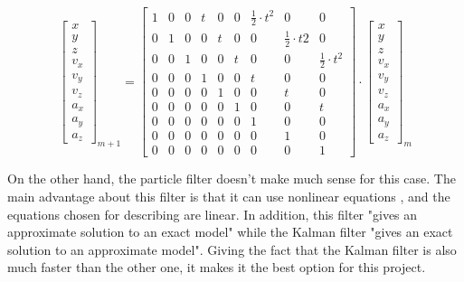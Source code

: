\begin{equation}
\begin{bmatrix}
x \\ y \\ z \\ v_{x} \\ v_{y} \\ v_{z} \\ a_{x} \\ a_{y} \\ a_{z}
\end{bmatrix}_{m+1}
=
\begin{bmatrix}
1 & 0 & 0 & t & 0 & 0 & \frac{1}{2}·t^{2} & 0 & 0 \\
0 & 1 & 0 & 0 & t & 0 & 0 & \frac{1}{2}·t{2} & 0 \\
0 & 0 & 1 & 0 & 0 & t & 0 & 0 & \frac{1}{2}·t^{2}	\\
0 & 0 & 0 & 1 & 0 & 0 & t & 0 & 0 \\
0 & 0 & 0 & 0 & 1 & 0 & 0 & t & 0 \\
0 & 0 & 0 & 0 & 0 & 1 & 0 & 0 & t \\
0 & 0 & 0 & 0 & 0 & 0 & 1 & 0 & 0 \\
0 & 0 & 0 & 0 & 0 & 0 & 0 & 1 & 0 \\
0 & 0 & 0 & 0 & 0 & 0 & 0 & 0 & 1
\end{bmatrix}
·
\begin{bmatrix}
x \\ y \\ z \\ v_{x} \\ v_{y} \\ v_{z} \\ a_{x} \\ a_{y} \\ a_{z}
\end{bmatrix}_{m}
\label{eq:motion_mat}
\end{equation}

On the other hand, the particle filter doesn't make much sense for this case. The main advantage about this filter is that it can use nonlinear equations \cite{kalman_lectures}, and the equations chosen for describing are linear. In addition, this filter "gives an approximate solution to an exact model" while the Kalman filter "gives an exact solution to an approximate model". Giving the fact that the Kalman filter is also much faster than the other one, it makes it the best option for this project.\\

